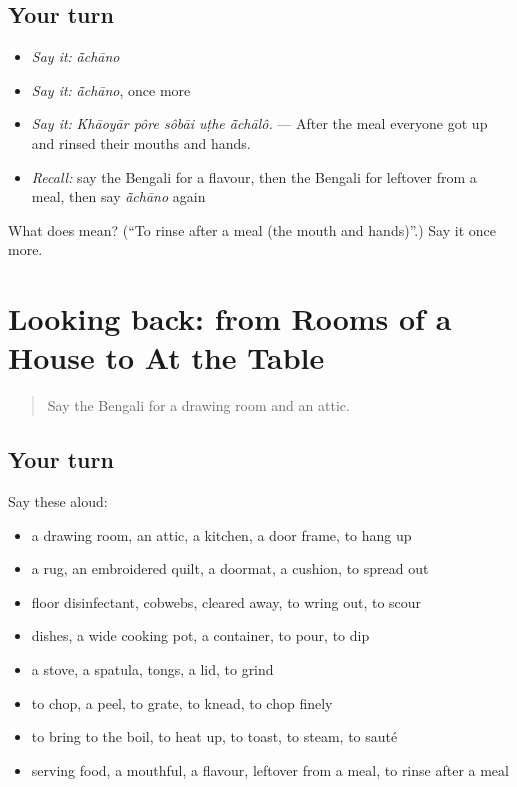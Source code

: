\subsection*{Your turn}
\begin{itemize}
\raggedright
  \item \emph{Say it:} \emph{ā̃chāno}
  \item \emph{Say it:} \emph{ā̃chāno}, once more
  \item \emph{Say it:} \emph{Khāoyār pôre sôbāi uṭhe ā̃chālô.} — After the meal everyone got up and rinsed their mouths and hands.
  \item \emph{Recall:} say the Bengali for a flavour, then the Bengali for leftover from a meal, then say \emph{ā̃chāno} again
\end{itemize}

\begin{tcolorbox}[breakable,colback=teal!4,colframe=teal!35!black,title={Before you move on}]
What does  mean? (\textquotedblleft{}To rinse after a meal (the mouth and hands)\textquotedblright{}.) Say it once more.
\end{tcolorbox}
\section[(dialogue)]{Looking back: from Rooms of a House to At the Table}

\label{lesson:BN-R515-review-508-515}



\begin{quote}
Say the Bengali for a drawing room and an attic.
\end{quote}

\subsection*{Your turn}
Say these aloud:

\begin{itemize}
\raggedright
  \item a drawing room, an attic, a kitchen, a door frame, to hang up
  \item a rug, an embroidered quilt, a doormat, a cushion, to spread out
  \item floor disinfectant, cobwebs, cleared away, to wring out, to scour
  \item dishes, a wide cooking pot, a container, to pour, to dip
  \item a stove, a spatula, tongs, a lid, to grind
  \item to chop, a peel, to grate, to knead, to chop finely
  \item to bring to the boil, to heat up, to toast, to steam, to sauté
  \item serving food, a mouthful, a flavour, leftover from a meal, to rinse after a meal
\end{itemize}

